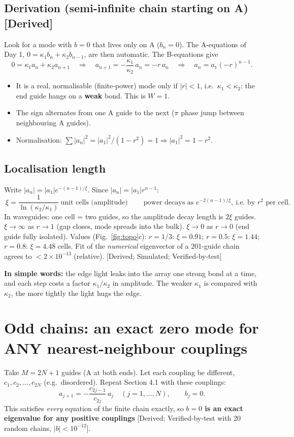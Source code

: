 \documentclass[10pt,a4paper]{article}
\newcommand{\ka}{\kappa_1}
\newcommand{\kc}{\kappa_2}
\newcommand{\evd}[1]{\textsf{\small[#1]}}
\newcommand{\simple}[1]{\par\noindent\textbf{In simple words:} #1\par\smallskip}
\begin{document}
\subsection{Derivation (semi-infinite chain starting on A) \evd{Derived}}
Look for a mode with $b=0$ that lives only on A ($b_n=0$). The A-equations of Day 1, $0=\ka b_n+\kc b_{n-1}$, are then automatic. The B-equations give
\[
0=\ka a_n+\kc a_{n+1}\quad\Longrightarrow\quad a_{n+1}=-\frac{\ka}{\kc}\,a_n=-r\,a_n\quad\Longrightarrow\quad a_n=a_1(-r)^{n-1}.
\]
\begin{itemize}[itemsep=1pt]
\item It is a real, normalisable (finite-power) mode only if $|r|<1$, i.e.\ $\ka<\kc$: the end guide hangs on a \textbf{weak} bond. This is $W=1$. \checkmark
\item The sign alternates from one A guide to the next ($\pi$ phase jump between neighbouring A guides).
\item Normalisation: $\sum|a_n|^2=|a_1|^2/(1-r^2)=1\Rightarrow|a_1|^2=1-r^2$.
\end{itemize}

\subsection{Localisation length}
Write $|a_n|=|a_1|e^{-(n-1)/\xi}$. Since $|a_n|=|a_1|r^{n-1}$:
\[
\boxed{\ \xi=\frac{1}{\ln(\kc/\ka)}\ \text{unit cells (amplitude)}\ }\qquad \text{power decays as }e^{-2(n-1)/\xi},\ \text{i.e. by }r^2\text{ per cell.}
\]
In waveguides: one cell = two guides, so the amplitude decay length is $2\xi$ guides. $\xi\to\infty$ as $r\to1$ (gap closes, mode spreads into the bulk). $\xi\to0$ as $r\to0$ (end guide fully isolated).
Values (Fig.~\ref{fig:topo}c): $r=1/3$: $\xi=0.91$; $r=0.5$: $\xi=1.44$; $r=0.8$: $\xi=4.48$ cells. Fit of the \emph{numerical} eigenvector of a 201-guide chain agrees to $<2\times10^{-13}$ (relative). \evd{Derived; Simulated; Verified-by-test}

\simple{the edge light leaks into the array one strong bond at a time, and each step costs a factor $\ka/\kc$ in amplitude. The weaker $\ka$ is compared with $\kc$, the more tightly the light hugs the edge.}

\section{Odd chains: an exact zero mode for ANY nearest-neighbour couplings}
Take $M=2N+1$ guides (A at both ends). Let each coupling be different, $c_1,c_2,\dots,c_{2N}$ (e.g.\ disordered). Repeat Section 4.1 with these couplings:
\[
a_{j+1}=-\frac{c_{2j-1}}{c_{2j}}\,a_j\quad(j=1,\dots,N),\qquad b_j=0 .
\]
This satisfies \emph{every} equation of the finite chain exactly, so \textbf{$b=0$ is an exact eigenvalue for any positive couplings} \evd{Derived; Verified-by-test with 20 random chains, $|b|<10^{-12}$}.
\end{document}
